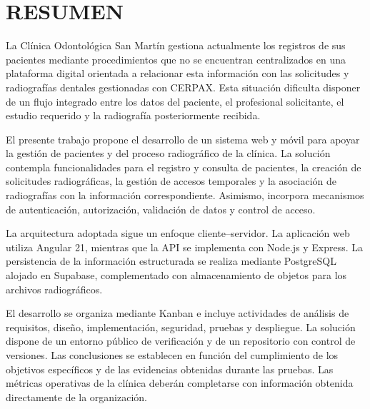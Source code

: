 	\clearpage
	
	\chapter*{RESUMEN}
	
	
	La Clínica Odontológica San Martín gestiona actualmente los registros
	de sus pacientes mediante procedimientos que no se encuentran
	centralizados en una plataforma digital orientada a relacionar esta
	información con las solicitudes y radiografías dentales gestionadas
	con CERPAX. Esta situación dificulta disponer de un flujo integrado
	entre los datos del paciente, el profesional solicitante, el estudio
	requerido y la radiografía posteriormente recibida.
	
	El presente trabajo propone el desarrollo de un sistema web y móvil
	para apoyar la gestión de pacientes y del proceso radiográfico de la
	clínica. La solución contempla funcionalidades para el registro y
	consulta de pacientes, la creación de solicitudes radiográficas,
	la gestión de accesos temporales y la asociación de radiografías con
	la información correspondiente. Asimismo, incorpora mecanismos de
	autenticación, autorización, validación de datos y control de acceso.
	
	La arquitectura adoptada sigue un enfoque cliente--servidor. La
	aplicación web utiliza Angular 21, mientras que la API se implementa
	con Node.js y Express. La persistencia de la información estructurada
	se realiza mediante PostgreSQL alojado en Supabase, complementado con
	almacenamiento de objetos para los archivos radiográficos.
	
	El desarrollo se organiza mediante Kanban e incluye actividades de
	análisis de requisitos, diseño, implementación, seguridad, pruebas y
	despliegue. La solución dispone de un entorno público de verificación
	y de un repositorio con control de versiones. Las conclusiones se
	establecen en función del cumplimiento de los objetivos específicos
	y de las evidencias obtenidas durante las pruebas. Las métricas
	operativas de la clínica deberán completarse con información obtenida
	directamente de la organización.
	
	
	\clearpage
	\setcounter{page}{1}
	
